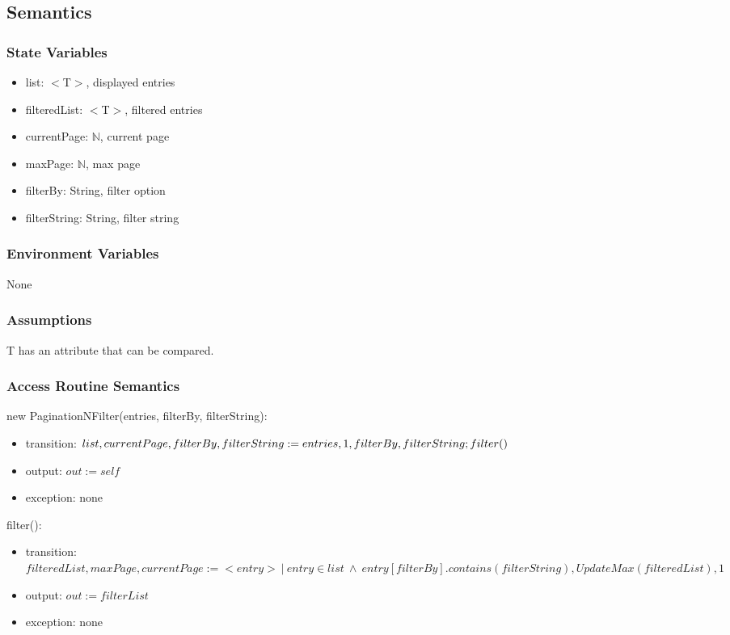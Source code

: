 \documentclass[12pt, titlepage]{article}
\begin{document}
\subsection{Semantics}

\subsubsection{State Variables}

\begin{itemize}
\item list: $<$T$>$, displayed entries
\item filteredList: $<$T$>$, filtered entries
\item currentPage: $\mathbb{N}$, current page
\item maxPage: $\mathbb{N}$, max page
\item filterBy: String, filter option
\item filterString: String, filter string
\end{itemize}

\subsubsection{Environment Variables}

None

\subsubsection{Assumptions}

T has an attribute that can be compared.

\subsubsection{Access Routine Semantics}

\noindent new PaginationNFilter(entries,  filterBy, filterString):
\begin{itemize}
\item transition: $list, currentPage, filterBy, filterString := entries, 1, filterBy, filterString;\\filter()$
\item output: $out := self$
\item exception: none
\end{itemize}

\noindent filter():
\begin{itemize}
\item transition: $filteredList, maxPage, currentPage := < entry >\ |\ entry \in list\ \land\ entry[filterBy].contains(filterString),UpdateMax(filteredList), 1$
\item output: $out := filterList$
\item exception: none
\end{itemize}
\end{document}
